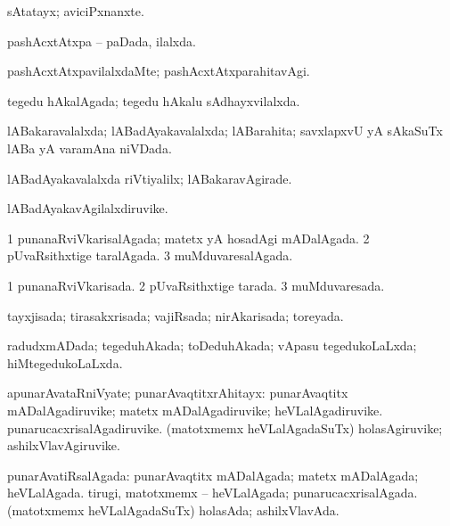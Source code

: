 \bentry
{} 
\gl{\nA}
\expl{}
\bmng
sAtatayx; aviciPxnanxte. 
\emng
\eentry

\bentry
{} 
\gl{\gu}
\expl{}
\bmng
pashAcxtAtxpa -- paDada, ilalxda. 
\emng
\eentry

\bentry
{} 
\gl{\kirxvi}
\expl{}
\bmng
pashAcxtAtxpavilalxdaMte; pashAcxtAtxparahitavAgi. 
\emng
\eentry

\bentry
{} 
\gl{\gu}
\expl{}
\bmng
tegedu hAkalAgada; tegedu hAkalu sAdhayxvilalxda. 
\emng
\eentry

\bentry
{} 
\gl{\gu}
\expl{}
\bmng
lABakaravalalxda; lABadAyakavalalxda; lABarahita; savxlapxvU yA sAkaSuTx lABa yA varamAna niVDada. 
\emng
\eentry

\bentry
{} 
\gl{\kirxvi}
\expl{}
\bmng
lABadAyakavalalxda riVtiyalilx; lABakaravAgirade. 
\emng
\eentry

\bentry
{} 
\gl{\nA}
\expl{}
\bmng
lABadAyakavAgilalxdiruvike. 
\emng
\eentry

\bentry
{} 
\gl{\gu}
\expl{}
\bmng
\bnum
\num{1} punanaRviVkarisalAgada; matetx yA hosadAgi mADalAgada. 
\num{2} pUvaRsithxtige taralAgada. 
\num{3} muMduvaresalAgada. 
\enum
\emng
\eentry

\bentry
{} 
\gl{\gu}
\expl{}
\bmng
\bnum
\num{1} punanaRviVkarisada. 
\num{2} pUvaRsithxtige tarada. 
\num{3} muMduvaresada. 
\enum
\emng
\eentry

\bentry
{} 
\gl{\gu}
\expl{}
\bmng
tayxjisada; tirasakxrisada; vajiRsada; nirAkarisada; toreyada. 
\emng
\eentry

\bentry
{} 
\gl{\gu}
\expl{}
\bmng
radudxmADada; tegeduhAkada; toDeduhAkada; vApasu tegedukoLaLxda; hiMtegedukoLaLxda. 
\emng
\eentry

\bentry
{} 
\gl{\nA}
\expl{}
\bmng
apunarAvataRniVyate; punarAvaqtitxrAhitayx: 
\banum
{} punarAvaqtitx mADalAgadiruvike; matetx mADalAgadiruvike; heVLalAgadiruvike. 
 punarucacxrisalAgadiruvike. 
 (matotxmemx heVLalAgadaSuTx) holasAgiruvike; ashilxVlavAgiruvike. 
\eanum
\emng
\eentry

\bentry
{} 
\gl{\gu}
\expl{}
\bmng
punarAvatiRsalAgada: 
\banum
{} punarAvaqtitx mADalAgada; matetx mADalAgada; heVLalAgada. 
 tirugi, matotxmemx -- heVLalAgada; punarucacxrisalAgada. 
 (matotxmemx heVLalAgadaSuTx) holasAda; ashilxVlavAda. 
\eanum
\emng
\eentry

